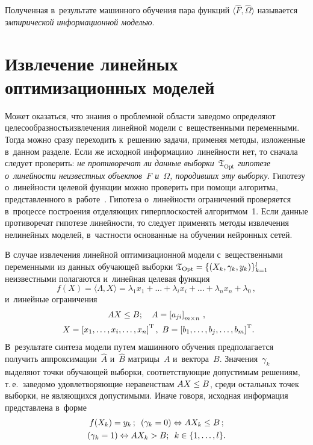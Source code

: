 \begin{multicols}{2}
Полученная в~результате машинного обучения пара функций 
$\langle \hat{F},\hat{\Omega}\rangle$ называется 
\textit{эмпирической информационной моделью}.

\section{Извлечение линейных оптимизационных моделей}

Может оказаться, что знания о проблемной области заведомо определяют 
целесообразность\linebreak извлечения линейной модели с~вещественными переменными. 
Тогда можно сразу переходить к~решению задачи, применяя  методы, 
изложенные в~данном разделе. Если же исходной информации\linebreak о~линейности нет, 
то сначала следует проверить: \textit{не противоречат ли данные 
выборки~$\mathfrak{T}_{\mathrm{Opt}}$ гипотезе о~линейности неизвестных объектов~$F$ 
и~$\Omega$, породивших эту выборку}. Гипотезу о~линейности целевой 
функции можно проверить при помощи алгоритма, представленного в~работе~\cite{8-don}. 
Гипотеза о~ли\-ней\-ности ограничений проверяется в~процессе по\-стро\-ения 
отделяющих ги\-пер\-плос\-ко\-стей алгоритмом~1. Если данные противоречат 
гипотезе линейности, то следует применять методы извлечения нелинейных 
моделей, в~част\-ности основанные на обучении нейронных сетей.

В случае извлечения линейной оптимизационной модели с~вещественными 
переменными из данных обучающей выборки  
$\mathfrak{T}_{\mathrm{Opt}}\hm=\{ (X_k,\gamma_k,y_k)\}_{k=1}^l$ 
  неизвестными полагаются и~линейная целевая функция
  $$
  f(X)=\langle 
  \Lambda,X \rangle = \lambda_1x_1+\dots + \lambda_ix_i
  +\dots +\lambda_nx_n +\lambda_0\,,
  $$
    и~линейные ограничения
\begin{multline*}
 AX \leq B;\quad
   A=\left[a_{ji}\right]_{m \times n}\,,\\
 X=\left[x_1,\dots,x_i,\dots,x_n\right]^{\mathrm{T}},\
B=\left[b_1,\dots,b_j,\dots,b_m\right]^{\mathrm{T}}\!.\hspace*{-4.8543pt}
\end{multline*}
В~результате синтеза модели путем машинного обуче\-ния предполагается 
получить аппроксимации~$\hat{A}$ и~$\hat{B}$ матрицы~$A$ и~вектора~$B$. 
Значения~$\gamma_k$ выделяют точки обучающей выборки, соответствующие 
допустимым решениям, т.\,е.\ заведомо удовлетворяющие неравенствам 
$ AX \hm\leq B$,  среди остальных точек выборки, не являющихся допустимыми. 
Иначе говоря, исходная информация представлена в~форме 
\begin{multline*}
f(X_k)=y_k\,;\enskip 
(\gamma_k = 0)\Leftrightarrow AX_k \leq B\,;\\ 
(\gamma_k = 1)\Leftrightarrow AX_k > B;\enskip k\in \{ 1,\dots,l\}.
\end{multline*}


\end{multicols}
